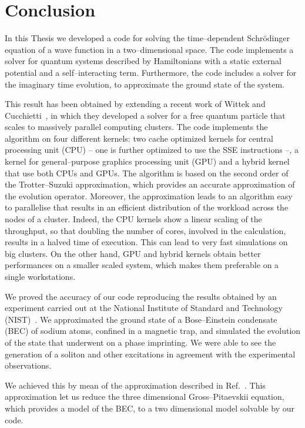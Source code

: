 \chapter{Conclusion}
In this Thesis we developed a code for solving the time--dependent Schr\"odinger equation of a wave function in a two--dimensional space. The code implements a solver for quantum systems described by Hamiltonians with a static external potential and a self--interacting term. Furthermore, the code includes a solver for the imaginary time evolution, to approximate the ground state of the system.

This result has been obtained by extending  a recent work of Wittek and Cucchietti~\citep{Wittek20131165}, in which they developed a solver for a free quantum particle that scales to massively parallel computing clusters. The code implements the algorithm on four different kernels: two cache optimized kernels for central processing unit (CPU) -- one is further optimized to use the SSE instructions --, a kernel for general--purpose graphics processing unit (GPU) and a hybrid kernel that use both CPUs and GPUs. The algorithm is based on the second order of the Trotter--Suzuki approximation, which provides an accurate approximation of the evolution operator. Moreover, the approximation leads to an algorithm easy to parallelise that results in an efficient distribution of the workload across the nodes of a cluster. Indeed, the CPU kernels show a linear scaling of the throughput, so that doubling the number of cores, involved in the calculation, results in a halved time of execution. This can lead to very fast simulations on big clusters. On the other hand, GPU and hybrid kernels obtain better performances on a smaller scaled system, which makes them preferable on a single workstations.

We proved the accuracy of our code reproducing the results obtained by an experiment carried out at the National Institute of Standard and Technology (NIST)~\citep{DSF00}. We approximated the ground state of a Bose--Einstein condensate (BEC) of sodium atoms, confined in a magnetic trap, and simulated the evolution of the state that underwent on a phase imprinting. We were able to see the generation of a soliton and other excitations in agreement with the experimental observations.

We achieved this by mean of the approximation described in Ref.~\citep{PietroMassignan}. This approximation let us reduce the three dimensional Gross--Pitaevskii equation, which provides a model of the BEC, to a two dimensional model solvable by our code.


